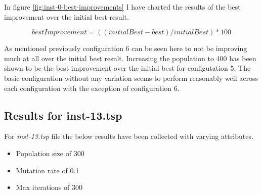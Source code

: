 In figure \ref{fig:inst-0-best-improvements} I have charted the results of the best improvement over the initial best result. 

\begin{equation}\label{eq:inst-0-best-improvement}
bestImprovement = ((initialBest - best) / initialBest) * 100
\end{equation}

As mentioned previously configuration 6 can be seen here to not be improving much at all over the initial best result. Increasing the population to 400 has been shown to be the best improvement over the initial best for configutation 5. The basic configuration without any variation seems to perform reasonably well across each configuration with the exception of configuration 6.

\subsection{Results for inst-13.tsp}

For \textit{inst-13.tsp} file the below results have been collected with varying attributes.

\begin{itemize}
  \item Population size of 300
  \item Mutation rate of 0.1
  \item Max iterations of 300
\end{itemize}

